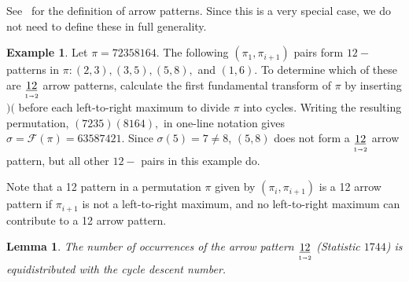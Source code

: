 \documentclass{amsart}
\newtheorem{lem}[thm]{Lemma}
\theoremstyle{definition}
\newtheorem{example}[thm]{Example}
\newcommand{\arrowpattern}{\underset{\mathsmaller{1\shortrightarrow 2}}{\underline{12}}}
\begin{document}
See~\cite[Definition 17]{TennerArrow} for the definition of arrow patterns. Since this is a very special case, we do not need to define these in full generality.

\begin{example}
  Let $\pi=72358164$.  The following $(\pi_1,\pi_{i+1})$ pairs form $12-$ patterns in $\pi: (2,3), (3,5), (5,8),$ and $(1,6)$.  To determine which of these are $\arrowpattern$ arrow patterns, calculate the
  first fundamental transform of $\pi$ by inserting $)($ before each left-to-right maximum to divide $\pi$ into cycles.  Writing the resulting permutation,  $(7235)(8164),$ in one-line notation gives $\sigma=\mathcal{F}(\pi)=63587421.$  Since $\sigma(5)=7\not=8$, $(5,8)$ does not form a $\arrowpattern$ arrow pattern, but all other $12-$ pairs in this example do.
\end{example}


Note that a 12 pattern in a permutation $\pi$ given by $(\pi_i, \pi_{i + 1})$ is a 12 arrow pattern if $\pi_{i + 1}$ is not a left-to-right maximum, and no left-to-right maximum can contribute to a 12 arrow pattern.

\begin{lem}\label{lem:317_373_1744} The number of occurrences of the arrow pattern $\arrowpattern$ (Statistic $1744$) is equidistributed with the cycle descent number.
 \end{lem}
\end{document}

